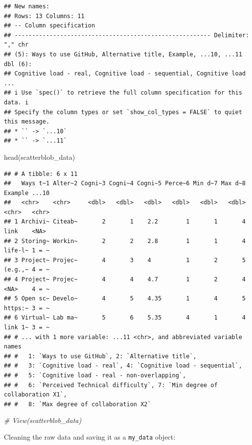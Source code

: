 \documentclass[
  11pt,
]{article}
\newenvironment{Shaded}{\begin{snugshade}}{\end{snugshade}}
\newcommand{\CommentTok}[1]{\textcolor[rgb]{0.56,0.35,0.01}{\textit{#1}}}
\newcommand{\FunctionTok}[1]{\textcolor[rgb]{0.00,0.00,0.00}{#1}}
\newcommand{\NormalTok}[1]{#1}
\begin{document}
\begin{verbatim}
## New names:
## Rows: 13 Columns: 11
## -- Column specification
## -------------------------------------------------------- Delimiter: "," chr
## (5): Ways to use GitHub, Alternative title, Example, ...10, ...11 dbl (6):
## Cognitive load - real, Cognitive load - sequential, Cognitive load ...
## i Use `spec()` to retrieve the full column specification for this data. i
## Specify the column types or set `show_col_types = FALSE` to quiet this message.
## * `` -> `...10`
## * `` -> `...11`
\end{verbatim}

\begin{Shaded}
\begin{Highlighting}[]
\FunctionTok{head}\NormalTok{(scatterblob\_data)}
\end{Highlighting}
\end{Shaded}

\begin{verbatim}
## # A tibble: 6 x 11
##   Ways t~1 Alter~2 Cogni~3 Cogni~4 Cogni~5 Perce~6 Min d~7 Max d~8 Example ...10
##   <chr>    <chr>     <dbl>   <dbl>   <dbl>   <dbl>   <dbl>   <dbl> <chr>   <chr>
## 1 Archivi~ Citeab~       2       1    2.2        1       1       4 link    <NA> 
## 2 Storing~ Workin~       2       2    2.8        1       1       4 life-l~ 1 = ~
## 3 Project~ Projec~       4       3    4          1       2       5 (e.g.,~ 4 = ~
## 4 Project~ Projec~       4       4    4.7        1       2       4 <NA>    4 = ~
## 5 Open sc~ Develo~       4       5    4.35       1       4       5 https:~ 3 = ~
## 6 Virtual~ Lab ma~       5       6    5.35       4       1       4 link 1~ 3 = ~
## # ... with 1 more variable: ...11 <chr>, and abbreviated variable names
## #   1: `Ways to use GitHub`, 2: `Alternative title`,
## #   3: `Cognitive load - real`, 4: `Cognitive load - sequential`,
## #   5: `Cognitive load - real - non-overlapping`,
## #   6: `Perceived Technical difficulty`, 7: `Min degree of collaboration X1`,
## #   8: `Max degree of collaboration X2`
\end{verbatim}

\begin{Shaded}
\begin{Highlighting}[]
\CommentTok{\#  View(scatterblob\_data)}
\end{Highlighting}
\end{Shaded}

Cleaning the raw data and saving it as a \texttt{my\_data} object:
\end{document}
